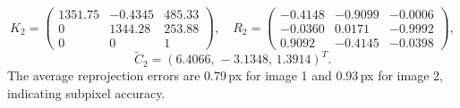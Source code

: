 \[
K_2 = \begin{pmatrix}
1351.75 & -0.4345 & 485.33 \\
0 & 1344.28 & 253.88 \\
0 & 0 & 1
\end{pmatrix},
\quad
R_2 = \begin{pmatrix}
-0.4148 & -0.9099 & -0.0006 \\
-0.0360 & 0.0171 & -0.9992 \\
 0.9092 & -0.4145 & -0.0398
\end{pmatrix},
\]
\[
\tilde C_2 = (6.4066,\,-3.1348,\,1.3914)^T.
\]
The average reprojection errors are 0.79\,px for image 1 and 0.93\,px for image 2, indicating subpixel accuracy.
